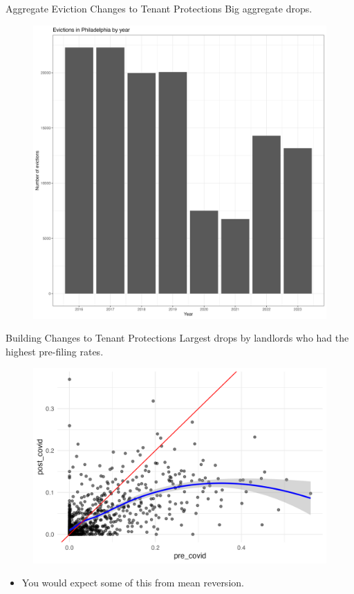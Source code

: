 \documentclass[aspectratio=169]{beamer}
\begin{document}
\begin{frame}{Aggregate Eviction Changes to Tenant Protections}
Big aggregate drops.

\tiny
\begin{figure}
  \includegraphics[scale=0.25]{figs/evict_by_year.png}
\end{figure}
\end{frame}


\begin{frame}{Building Changes to Tenant Protections}
Largest drops by landlords who had the highest pre-filing rates.

\tiny
\begin{figure}
  \includegraphics[scale=0.5]{figs/filing_rate_pre_post_covid.png}
\end{figure}

\begin{itemize}
  \item You would expect some of this from mean reversion.
\end{itemize}
\end{frame}
\end{document}
